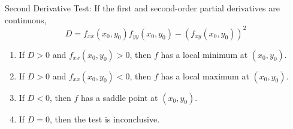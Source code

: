 \documentclass[10pt,twocolumn]{extarticle}
\begin{document}
Second Derivative Test: If the first and second-order partial derivatives are continuous,
\[D=f_{xx}(x_0,y_0)f_{yy}(x_0,y_0)-{(f_{xy}(x_0,y_0))}^2\]
\begin{enumerate}
    \item If $D>0$ and $f_{xx}(x_0,y_0)>0$, then $f$ has a local minimum at $(x_0,y_0)$.
    \item If $D>0$ and $f_{xx}(x_0,y_0)<0$, then $f$ has a local maximum at $(x_0,y_0)$.
    \item If $D<0$, then $f$ has a saddle point at $(x_0,y_0)$.
    \item If $D=0$, then the test is inconclusive.
\end{enumerate}
\end{document}
